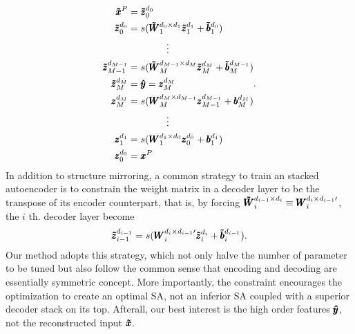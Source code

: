 {\begin{equation} \label{eq:ED}
\begin{split}
  \pmb{\tilde{x}}^P &= {\pmb{\tilde{z}}_{0}^{d_{0}}} \\
  {\pmb{\tilde{z}}_{0  }^{d_{0  }}} &= s(\pmb{\tilde{W}}_{1  }^{d_{0  } \times d_{1  }} {\pmb{\tilde{z}}_{1  }^{d_{1  }}} + \pmb{\tilde{b}}_{1}^{d_{0  }}) \\
  & \quad \quad \quad \quad \vdots \\
  {\pmb{\tilde{z}}_{M-1}^{d_{M-1}}} &= s(\pmb{\tilde{W}}_{M  }^{d_{M-1} \times d_{M  }} {\pmb{\tilde{z}}_{M  }^{d_{M  }}} + \pmb{\tilde{b}}_{M}^{d_{M-1}}) \\
  {\pmb{\tilde{z}}_{M  }^{d_{M  }}} &= \pmb{\hat{y}} = {\pmb{z}_{M}^{d_{M}}} \\
  {\pmb{z}_{M  }^{d_{M  }}} &= s(\pmb{W}_{M  }^{d_{M  } \times d_{M-1}} {\pmb{z}_{M-1}^{d_{M-1}}} + \pmb{b}_{M}^{d_{M  }}) \\
  & \quad \quad \quad \quad \vdots \\
  {\pmb{z}_{1  }^{d_{1  }}} &= s(\pmb{W}_{1  }^{d_{1  } \times d_{0  }} {\pmb{z}_{0  }^{d_{0  }}} + \pmb{b}_{1}^{d_{1  }}) \\
  {\pmb{z}_{0  }^{d_{0  }}} &= \pmb{x}^P
\end{split}.
\end{equation}
In addition to structure mirroring, a common strategy to train an stacked  autoencoder is to constrain the weight matrix in a decoder layer to be the transpose of its encoder counterpart, that is, by forcing $\pmb{\tilde{W}}_{i}^{d_{i-1} \times d_{i}} \equiv \pmb{W}_{i}^{d_{i} \times d_{i-1}\prime}$, the $i$ th. decoder layer become
\begin{equation} \label{eq:CW}
  {\pmb{\tilde{z}}_{i-1}^{d_{i-1}}} = s(\pmb{W}_{i}^{d_{i} \times d_{i-1}\prime} {\pmb{\tilde{z}}_{i  }^{d_{i  }}} + \pmb{\tilde{b}}_{i  }^{d_{i-1}}).
\end{equation}
Our method adopts this strategy, which not only halve the number of parameter to be tuned but also follow the common sense that encoding and decoding are essentially symmetric concept. More importantly, the constraint encourages the optimization to create an optimal SA, not an inferior SA coupled with a superior decoder stack on its top. Afterall, our best interest is the high order features $\pmb{\hat{y}}$, not the reconstructed input $\pmb{\tilde{x}}$.

}
